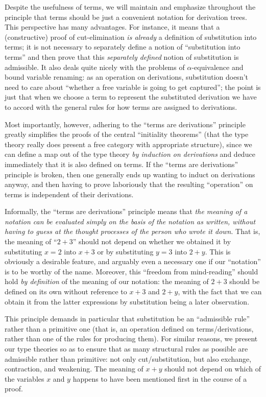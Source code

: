 Despite the usefulness of terms, we will maintain and emphasize throughout the principle that terms should be just a convenient notation for derivation trees.
This perspective has many advantages.
For instance, it means that a (constructive) proof of cut-elimination \emph{is already} a definition of substitution into terms; it is not necessary to separately define a notion of ``substitution into terms'' and then prove that this \emph{separately defined} notion of substitution is admissible.
It also deals quite nicely with the problems of $\alpha$-equivalence and bound variable renaming: as an operation on derivations, substitution doesn't need to care about ``whether a free variable is going to get captured''; the point is just that when we choose a term to represent the substituted derivation we have to accord with the general rules for how terms are assigned to derivations.

Most importantly, however, adhering to the ``terms are derivations'' principle greatly simplifies the proofs of the central ``initiality theorems'' (that the type theory really does present a free category with appropriate structure), since we can define a map out of the type theory \emph{by induction on derivations} and deduce immediately that it is also defined on terms.
If the ``terms are derivations'' principle is broken, then one generally ends up wanting to induct on derivations anyway, and then having to prove laboriously that the resulting ``operation'' on terms is independent of their derivations.

Informally, the ``terms are derivations'' principle means that \emph{the meaning of a notation can be evaluated simply on the basis of the notation as written, without having to guess at the thought processes of the person who wrote it down}.
That is, the meaning of ``$2+3$'' should not depend on whether we obtained it by substituting $x=2$ into $x+3$ or by substituting $y=3$ into $2+y$.
This is obviously a desirable feature, and arguably even a necessary one if our ``notation'' is to be worthy of the name.
Moreover, this ``freedom from mind-reading'' should hold \emph{by definition} of the meaning of our notation: the meaning of $2+3$ should be defined on its own without reference to $x+3$ and $2+y$, with the fact that we can obtain it from the latter expressions by substitution being a later observation.

This principle demands in particular that substitution be an ``admissible rule'' rather than a primitive one (that is, an operation defined on terms/derivations, rather than one of the rules for producing them).
For similar reasons, we present our type theories so as to ensure that as many structural rules as possible are admissible rather than primitive: not only cut/substitution, but also exchange, contraction, and weakening.
The meaning of $x+y$ should not depend on which of the variables $x$ and $y$ happens to have been mentioned first in the course of a proof.


